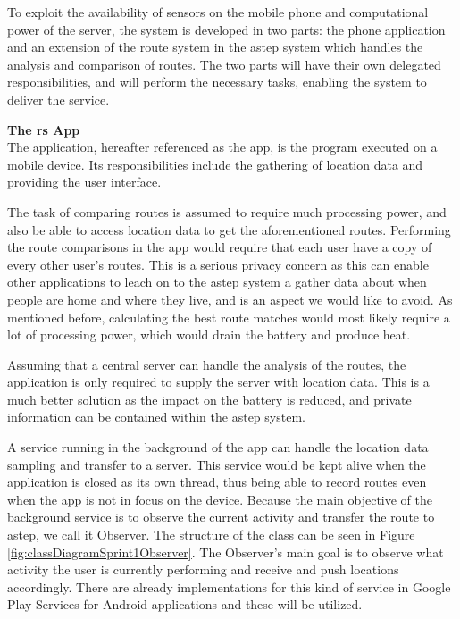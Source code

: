 To exploit the availability of sensors on the mobile phone and computational power of the server, the system is developed in two parts: the phone application and an extension of the route system in the \gls{astep} system which handles the analysis and comparison of routes.
The two parts will have their own delegated responsibilities, and will perform the necessary tasks, enabling the system to deliver the service.

\textbf{The \gls{rs} App}\\
The application, hereafter referenced as the app, is the program executed on a mobile device.
Its responsibilities include the gathering of location data and providing the user interface. 

The task of comparing routes is assumed to require much processing power, and also be able to access location data to get the aforementioned routes.
Performing the route comparisons in the app would require that each user have a copy of every other user's routes.
This is a serious privacy concern as this can enable other applications to leach on to the \gls{astep} system a gather data about when people are home and where they live, and is an aspect we would like to avoid.
As mentioned before, calculating the best route matches would most likely require a lot of processing power, which would drain the battery and produce heat.

Assuming that a central server can handle the analysis of the routes, the application is only required to supply the server with location data.
This is a much better solution as the impact on the battery is reduced, and private information can be contained within the \gls{astep} system.

A service running in the background of the app can handle the location data sampling and transfer to a server.
This service would be kept alive when the application is closed as its own thread, thus being able to record routes even when the app is not in focus on the device.
Because the main objective of the background service is to observe the current activity and transfer the route to \gls{astep}, we call it Observer.
The structure of the class can be seen in Figure \ref{fig:classDiagramSprint1Observer}.
The Observer's main goal is to observe what activity the user is currently performing and receive and push locations accordingly.
There are already implementations for this kind of service in Google Play Services for Android applications and these will be utilized.


